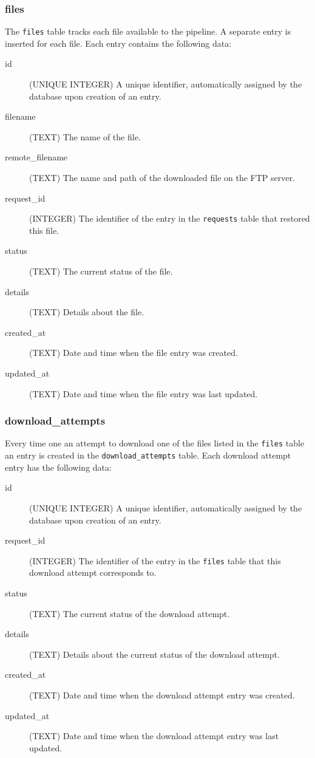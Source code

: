 \documentclass[12pt]{article}
\begin{document}
\subsubsection{files}
The \texttt{files} table tracks each file available to the pipeline. A separate entry is inserted for each file. Each entry contains the following data:

\begin{description}
    \item[id] (UNIQUE INTEGER)  A unique identifier, automatically assigned by the database upon creation of an entry.
    \item[filename] (TEXT) The name of the file.
    \item[remote\_filename] (TEXT) The name and path of the downloaded file on the FTP server.
    \item[request\_id] (INTEGER) The identifier of the entry in the \texttt{requests} table that restored this file.
    \item[status] (TEXT) The current status of the file.
    \item[details] (TEXT) Details about the file.
    \item[created\_at] (TEXT) Date and time when the file entry was created.
    \item[updated\_at] (TEXT) Date and time when the file entry was last updated.
\end{description}

\subsubsection{download\_attempts}
Every time one an attempt to download one of the files listed in the \texttt{files} table an entry is created in the \texttt{download\_attempts} table. Each download attempt entry has the following data:

\begin{description}
    \item[id] (UNIQUE INTEGER)  A unique identifier, automatically assigned by the database upon creation of an entry.
    \item[request\_id] (INTEGER) The identifier of the entry in the \texttt{files} table that this download attempt corresponds to.
    \item[status] (TEXT) The current status of the download attempt.
    \item[details] (TEXT) Details about the current status of the download attempt.
    \item[created\_at] (TEXT) Date and time when the download attempt entry was created.
    \item[updated\_at] (TEXT) Date and time when the download attempt entry was last updated.
\end{description}
\end{document}
